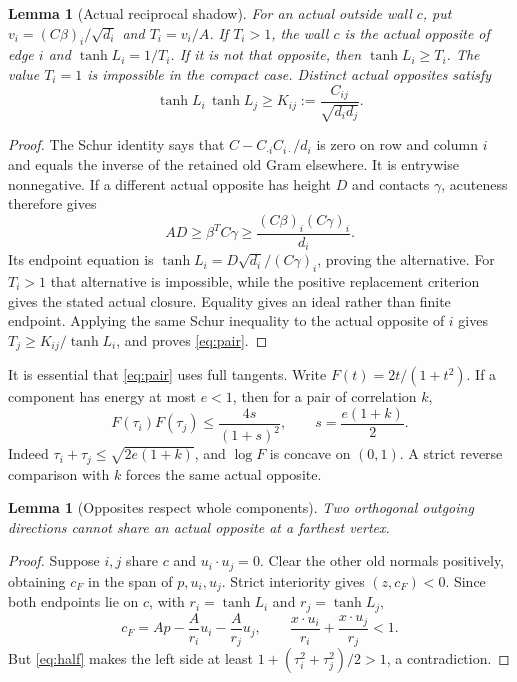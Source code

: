 \documentclass[11pt]{article}
\newtheorem{lemma}[theorem]{Lemma}
\theoremstyle{remark}
\begin{document}
\begin{lemma}[Actual reciprocal shadow]\label{lem:shadow}
For an actual outside wall $c$, put
$v_i=(C\beta)_i/\sqrt{d_i}$ and $T_i=v_i/A$.
If $T_i>1$, the wall $c$ is the actual opposite of edge $i$ and
$\tanh L_i=1/T_i$. If it is not that opposite, then
$\tanh L_i\ge T_i$. The value $T_i=1$ is impossible in the compact
case. Distinct actual opposites satisfy
\begin{equation}\label{eq:pair}
 \tanh L_i\,\tanh L_j\ge
 K_{ij}:=\frac{C_{ij}}{\sqrt{d_id_j}}.
\end{equation}
\end{lemma}
\begin{proof}
The Schur identity says that
$C-C_{\cdot i}C_{i\cdot}/d_i$ is zero on row and column $i$ and
equals the inverse of the retained old Gram elsewhere. It is
entrywise nonnegative. If a different actual opposite has height
$D$ and contacts $\gamma$, acuteness therefore gives
\[
 AD\ge\beta^TC\gamma
 \ge\frac{(C\beta)_i(C\gamma)_i}{d_i}.
\]
Its endpoint equation is
$\tanh L_i=D\sqrt{d_i}/(C\gamma)_i$, proving the alternative.
For $T_i>1$ that alternative is impossible, while the positive
replacement criterion gives the stated actual closure. Equality
gives an ideal rather than finite endpoint. Applying the same
Schur inequality to the actual opposite of $i$ gives
$T_j\ge K_{ij}/\tanh L_i$, and proves \eqref{eq:pair}.
\end{proof}

It is essential that \eqref{eq:pair} uses full tangents.
Write $F(t)=2t/(1+t^2)$. If a component has energy at most $e<1$,
then for a pair of correlation $k$,
\begin{equation}\label{eq:pairupper}
 F(\tau_i)F(\tau_j)
 \le\frac{4s}{(1+s)^2},
 \qquad s=\frac{e(1+k)}2.
\end{equation}
Indeed $\tau_i+\tau_j\le\sqrt{2e(1+k)}$, and $\log F$ is concave
on $(0,1)$. A strict reverse comparison with $k$ forces the same
actual opposite.

\begin{lemma}[Opposites respect whole components]\label{lem:orthogonal}
Two orthogonal outgoing directions cannot share an actual opposite
at a farthest vertex.
\end{lemma}
\begin{proof}
Suppose $i,j$ share $c$ and $u_i\cdot u_j=0$. Clear the other old
normals positively, obtaining $c_F$ in the span of $p,u_i,u_j$.
Strict interiority gives $(z,c_F)<0$. Since both endpoints lie on $c$,
with $r_i=\tanh L_i$ and $r_j=\tanh L_j$,
\[
 c_F=A p-\frac A{r_i}u_i-\frac A{r_j}u_j,
 \qquad \frac{x\cdot u_i}{r_i}+\frac{x\cdot u_j}{r_j}<1.
\]
But \eqref{eq:half} makes the left side at least
$1+(\tau_i^2+\tau_j^2)/2>1$, a contradiction.
\end{proof}
\end{document}
